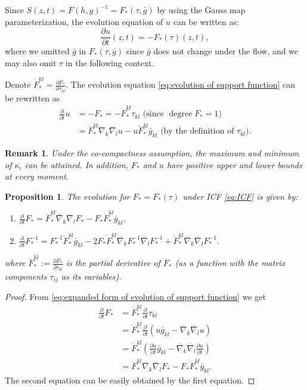 \documentclass[10pt,a4paper]{amsart}
\newtheorem{proposition}[theorem]{Proposition}
\newtheorem{remark}[theorem]{Remark}
\newcommand{\pd}[2]{\frac{\partial {#1}}{\partial {#2}}}
\newcommand{\bnabla}{\overline{\nabla}}
\newcommand{\bg}{\bar{g}}
\numberwithin{equation}{section}
\begin{document}
Since \(S(z,t) = F(h,g)^{-1} = F_{*}(\tau, \bg)\) by using the Gauss map parameterization, the evolution equation of \(u\) can be written as: 
\begin{equation}\label{eq:evolution of support function}
    \pd{u}{t}(z,t) = -F_{*}(\tau)(z,t),
\end{equation}
where we omitted \(\bg\) in \(F_*(\tau, \bg)\) since \(\bg\) does not change under the flow, and we may also omit \(\tau\) in the following context. 
\par Denote \(\dot{F}_*^{kl} = \pd{F_*}{\tau_{kl}}\). The evolution equation \eqref{eq:evolution of support function} can be rewritten as
\begin{equation}\label{eq:expanded form of evolution of support function}
    \begin{aligned}
        \pd{}{t}u &=-F_* = -\dot{F}_*^{kl}\tau_{kl}\text{ (since \(\operatorname{degree}F_* = 1\)) } \\
        &= \dot{F}_*^{kl}\bnabla_k \bnabla_l u - u\dot{F}_*^{kl}\bg_{kl}\text{ (by the definition of \(\tau_{kl}\))}.
    \end{aligned}
\end{equation}
\begin{remark}\label{rem:induced functions}
    Under the co-compactness assumption, the maximum and minimum of \(\kappa_i\) can be attained. In addition, \(F_*\) and \(u\) have positive upper and lower bounds at every moment. 
\end{remark}
\begin{proposition}\label{prop:evolution of speed}
    The evolution for $F_* = F_*(\tau)$ under ICF \eqref{eq:ICF} is given by: 
    \begin{enumerate}[label=(\arabic*)]
        \item $\displaystyle \pd{}{t}F_{*} = \dot{F}_*^{kl}\bnabla_k \bnabla_l F_* - F_* \dot{F}_*^{kl}{\bg}_{kl}$,
        \item $\displaystyle \pd{}{t}F_{*}^{-1} = F_*^{-1} \dot{F}_*^{kl}\bg_{kl} - 2F_* \dot{F}_*^{kl}\bnabla_k F_*^{-1}\bnabla_l F_*^{-1} + \dot{F}_*^{kl}\bnabla_k \bnabla_l F_*^{-1} $.
    \end{enumerate}
    where \(\dot{F}_*^{kl}:= \pd{F_*}{\tau_{kl}}\) is the partial derivative of \(F_*\) (as a function with the matrix components \(\tau_{ij}\) as its variables).  
\end{proposition}
\begin{proof}
    From \eqref{eq:expanded form of evolution of support function} we get 
    \[ \begin{aligned}
        \pd{}{t}F_* &= \dot{F}_*^{kl}\pd{}{t}\tau_{kl} \\
        &= \dot{F}_*^{kl}\pd{}{t}\left( u\bg_{kl} - \bnabla_k\bnabla_l u \right) \\
        &= \dot{F}_*^{kl}\left(\pd{u}{t}\bg_{kl} - \bnabla_k \bnabla_l \pd{u}{t}\right) \\
        &= \dot{F}_*^{kl}\bnabla_k \bnabla_l F_* - F_* \dot{F}_*^{kl}\bg_{kl}.
    \end{aligned}  \]
    The second equation can be easily obtained by the first equation.
\end{proof}
\end{document}
